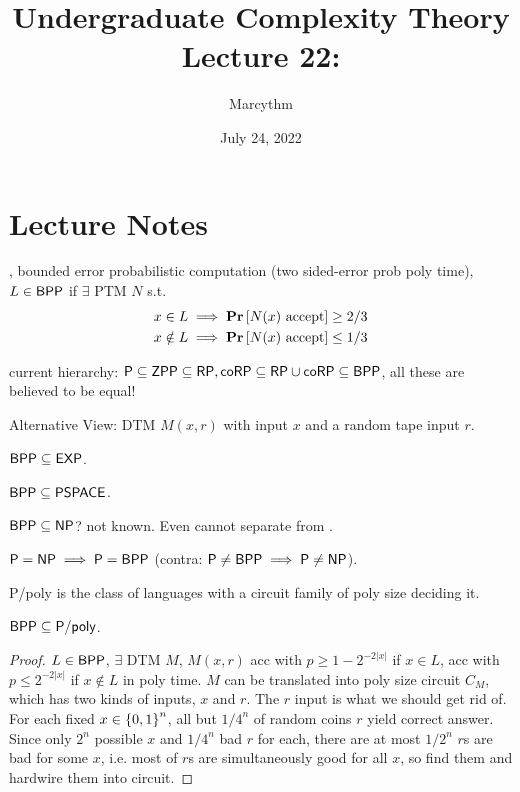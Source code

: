 \documentclass{article}
\title{Undergraduate Complexity Theory \\ Lecture 22: \BPP}
\author{Marcythm}
\date{July 24, 2022}
\begin{document}
\maketitle{}

\section{Lecture Notes}

\begin{definition}
  \BPP, bounded error probabilistic computation (two sided-error prob poly time), \(L \in \text{\sf BPP}\) if \(\exists\) PTM \(N\) s.t.
  \[ \begin{aligned}
    x \in L &\implies \mathop{\bf Pr\/}\left\lbrack \text{\(N(x)\) accept} \right\rbrack \geq 2/3 \\
    x \notin L &\implies \mathop{\bf Pr\/}\left\lbrack \text{\(N(x)\) accept} \right\rbrack \leq 1/3
  \end{aligned} \]
\end{definition}

current hierarchy: \(\text{\sf P} \subseteq \text{\sf ZPP} \subseteq \text{\sf RP}, \text{\sf coRP} \subseteq \text{\sf RP} \cup \text{\sf coRP} \subseteq \text{\sf BPP}\), all these are believed to be equal!

Alternative View: DTM \(M(x, r)\) with input \(x\) and a random tape input \(r\).

\begin{lemma}
  \(\text{\sf BPP} \subseteq \text{\sf EXP}\).
\end{lemma}

\begin{corollary}
  \(\text{\sf BPP} \subseteq \text{\sf PSPACE}\).
\end{corollary}

\(\text{\sf BPP} \subseteq \text{\sf NP}\)? not known. Even cannot separate \BPP from \NEXP.

\begin{theorem}
  \(\text{\sf P} = \text{\sf NP} \implies \text{\sf P} = \text{\sf BPP}\) (contra: \(\text{\sf P} \neq \text{\sf BPP} \implies \text{\sf P} \neq \text{\sf NP}\)).
\end{theorem}

\begin{definition}
  {\sf P/poly} is the class of languages with a circuit family of poly size deciding it.
\end{definition}

\begin{theorem}
  \(\text{\sf BPP} \subseteq {\sf P/poly}\).
\end{theorem}

\begin{proof}
  \(L \in \text{\sf BPP}\), \(\exists\) DTM \(M\), \(M(x, r)\) acc with \(p \geq 1 - 2^{-2|x|}\) if \(x \in L\), acc with \(p \leq 2^{-2|x|}\) if \(x \notin L\) in poly time.
  \(M\) can be translated into poly size circuit \(C_M\), which has two kinds of inputs, \(x\) and \(r\). The \(r\) input is what we should get rid of. \\
  For each fixed \(x \in \left\lbrace 0, 1 \right\rbrace^n\), all but \(1/4^n\) of random coins \(r\) yield correct answer. Since only \(2^n\) possible \(x\) and \(1/4^n\) bad \(r\) for each, there are at most \(1/2^n\) \(r\)s are bad for some \(x\), i.e. most of \(r\)s are simultaneously good for all \(x\), so find them and hardwire them into circuit.
\end{proof}
\end{document}
